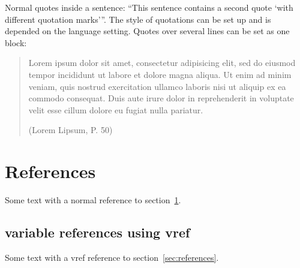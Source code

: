 \begin{filecontents*}{\democodefile}
Normal quotes inside a sentence: \enquote{This sentence contains a second
quote \enquote{with different quotation marks}}. The style of
quotations can be set up and is depended on the language setting. 
Quotes over several lines can be set as one block: \blockquote[(Lorem Lipsum,
P. 50)]{Lorem ipsum dolor sit amet, consectetur adipisicing elit, sed do
eiusmod tempor incididunt ut labore et dolore magna aliqua. Ut enim ad minim
veniam, quis nostrud exercitation ullamco laboris nisi ut aliquip ex ea
commodo consequat. Duis aute irure dolor in reprehenderit in voluptate velit
esse cillum dolore eu fugiat nulla pariatur.}
\end{filecontents*}

%

%
\section{References}
\label{sec:references}

\begin{filecontents*}{\democodefile}
Some text with a normal reference 
to section~\ref{sec:references}.
\end{filecontents*}

%

\subsection{variable references using vref}

\begin{filecontents*}{\democodefile}
Some text with a vref reference 
to section~\vref{sec:references}.
\end{filecontents*}

%

